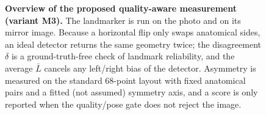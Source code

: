 \begin{figure}[t]
{}
\caption{\textbf{Overview of the proposed quality-aware measurement (variant M3).}
The landmarker is run on the photo and on its mirror image. Because a horizontal flip only
swaps anatomical sides, an ideal detector returns the same geometry twice; the disagreement
$\delta$ is a ground-truth-free check of landmark reliability, and the average $\bar L$
cancels any left/right bias of the detector. Asymmetry is measured on the standard 68-point
layout with fixed anatomical pairs and a fitted (not assumed) symmetry axis, and a score is
only reported when the quality/pose gate does not reject the image.}
\label{fig:overview}
\end{figure}

